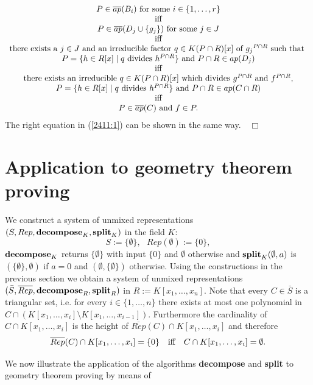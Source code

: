 \smallskip 
\[ 
\begin{array}{c}
P\in \overline{ap}(B_i) \hbox{ for some } i\in\{1,\ldots,r\} \\
\hbox{iff}\\
P\in \overline{ap}(D_j\cup\{g_j\}) \hbox{ for some } 
j\in J\\
\hbox{iff}\\
\hbox{there exists a $j\in J$ and an 
irreducible factor
$q\in K(P\cap R)[x]$ of ${g_j}^{P\cap R}$ such that } \\
P=\{h\in R[x]\mid 
q \hbox{ divides } h^{P\cap R}\} \hbox{ and } P\cap R\in ap(D_j) \\
\hbox{iff}\\
\hbox{there exists an 
irreducible $q\in K(P\cap R)[x]$ which divides $g^{P\cap R}$ and $
f^{P\cap R}$,} \\
P=\{h\in R[x]\mid 
q \hbox{ divides } h^{P\cap R}\} \hbox{ and } P\cap R\in ap(C\cap R) \\
\hbox{iff}\\
P\in \overline{ap}(C) \hbox{ and } f\in P.
\end{array}
\]  
The right equation 
in (\ref{2411:1}) can be shown in the same way.\ \ $\Box$



\section{Application to geometry theorem proving}

We construct a system of unmixed representations 
$(S,Rep,{\bf decompose}_K,{\bf split}_K)$ in the field $K$:
\[ S:=\{\emptyset\},\ \ \ Rep(\emptyset):=\{0\}, \]
${\bf decompose}_K$ returns $\{\emptyset\}$ with input $\{0\}$ and 
$\emptyset$ otherwise and ${\bf split}_K(\emptyset,a)$ is 
$(\{\emptyset\},\emptyset)$ if $a=0$ and $(\emptyset,\{\emptyset\})$
otherwise. Using the constructions in the previous section we obtain
a system of unmixed representations
$(\bar{S},\overline{Rep},{\bf decompose}_R,{\bf split}_R)$ in 
$R:=K[x_1,\ldots,x_n]$.
Note that every $C\in\bar{S}$ is a triangular set, i.e. for every 
$i\in\{1,\ldots,n\}$ there exists at most one polynomial in 
$C\cap (K[x_1,\ldots,x_i]\setminus K[x_1,\ldots,x_{i-1}])$. Furthermore
the cardinality of $C\cap K[x_1,\ldots,x_i]$ is the height of 
$\overline{Rep}(C)\cap K[x_1,\ldots,x_i]$ and therefore 
\[ \overline{Rep}(C)\cap K[x_1,\ldots,x_i]=\{0\}\ \ \hbox{ iff }\ \ 
C\cap K[x_1,\ldots,x_i]=\emptyset. \]


\smallskip
We now illustrate the application of the algorithms {\bf decompose} and 
{\bf split} to geometry theorem proving by means of 

